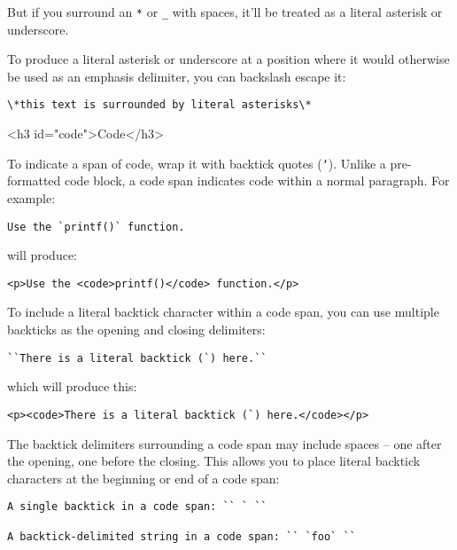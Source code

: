 But if you surround an \texttt{*} or \texttt{\_} with spaces, it'll be treated as a
literal asterisk or underscore.



To produce a literal asterisk or underscore at a position where it
would otherwise be used as an emphasis delimiter, you can backslash
escape it:

\begin{lstlisting}
\*this text is surrounded by literal asterisks\*
\end{lstlisting}


<h3 id="code">Code</h3>



To indicate a span of code, wrap it with backtick quotes (\texttt{`}).
Unlike a pre-formatted code block, a code span indicates code within a
normal paragraph. For example:

\begin{lstlisting}
Use the `printf()` function.
\end{lstlisting}




will produce:

\begin{lstlisting}
<p>Use the <code>printf()</code> function.</p>
\end{lstlisting}




To include a literal backtick character within a code span, you can use
multiple backticks as the opening and closing delimiters:

\begin{lstlisting}
``There is a literal backtick (`) here.``
\end{lstlisting}




which will produce this:

\begin{lstlisting}
<p><code>There is a literal backtick (`) here.</code></p>
\end{lstlisting}




The backtick delimiters surrounding a code span may include spaces --
one after the opening, one before the closing. This allows you to place
literal backtick characters at the beginning or end of a code span:

\begin{lstlisting}
A single backtick in a code span: `` ` ``

A backtick-delimited string in a code span: `` `foo` ``
\end{lstlisting}




